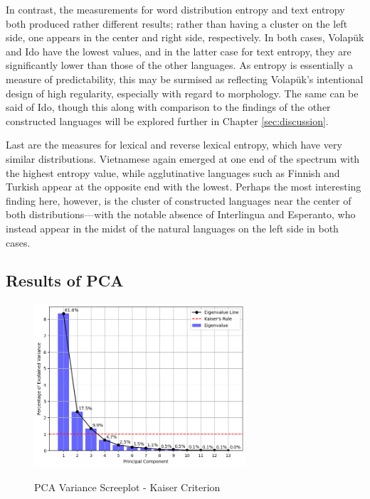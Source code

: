 \documentclass[12pt,a4paper]{article}
\numberwithin{figure}{section}
\numberwithin{table}{section}
\numberwithin{definition}{section}
\begin{document}
In contrast, the measurements for word distribution entropy and text entropy both produced rather different results; rather than having a cluster on the left side, one appears in the center and right side, respectively. In both cases, Volapük and Ido have the lowest values, and in the latter case for text entropy, they are significantly lower than those of the other languages. As entropy is essentially a measure of predictability, this may be surmised as reflecting Volapük's intentional design of high regularity, especially with regard to morphology. The same can be said of Ido, though this along with comparison to the findings of the other constructed languages will be explored further in Chapter \ref{sec:discussion}. 

Last are the measures for lexical and reverse lexical entropy, which have very similar distributions. Vietnamese again emerged at one end of the spectrum with the highest entropy value, while agglutinative languages such as Finnish and Turkish appear at the opposite end with the lowest. Perhaps the most interesting finding here, however, is the cluster of constructed languages near the center of both distributions---with the notable absence of Interlingua and Esperanto, who instead appear in the midst of the natural languages on the left side in both cases.



\subsection{Results of PCA}
\label{ssec:pcaresults}



\begin{figure}[!h]
  \centering
  \caption{PCA Variance Screeplot - Kaiser Criterion}
  \includegraphics[width=0.7\textwidth]{PCA_Variance_Screeplot_kaiser.png}
  \label{fig:pckaiser}
\end{figure}
\end{document}
